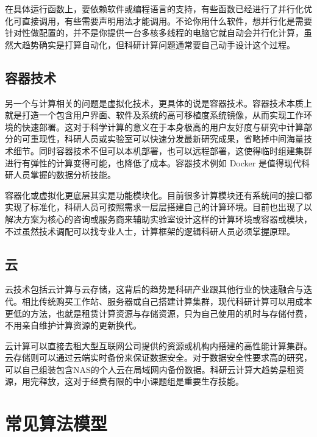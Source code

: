 \documentclass[]{tufte-book}
\begin{document}
在具体运行函数上，要依赖软件或编程语言的支持，有些函数已经进行了并行化优化可直接调用，有些需要声明用法才能调用。不论你用什么软件，想并行化是需要针对性做配置的，并不是你提供一台多核多线程的电脑它就自动会并行化计算，虽然大趋势确实是打算自动化，但科研计算问题通常要自己动手设计这个过程。

\hypertarget{ux5bb9ux5668ux6280ux672f}{%
\subsection{容器技术}\label{ux5bb9ux5668ux6280ux672f}}

另一个与计算相关的问题是虚拟化技术，更具体的说是容器技术。容器技术本质上就是打造一个包含用户界面、软件及系统的高可移植度系统镜像，从而实现工作环境的快速部署。这对于科学计算的意义在于本身极高的用户友好度与研究中计算部分的可重现性，科研人员或实验室可以快速分发最新研究成果，省略掉中间海量技术细节。同时容器技术不但可以本机部署，也可以远程部署，这使得临时组建集群进行有弹性的计算变得可能，也降低了成本。容器技术例如 Docker 是值得现代科研人员掌握的数据分析技能。

容器化或虚拟化更底层其实是功能模块化。目前很多计算模块还有系统间的接口都实现了标准化，科研人员可按照需求一层层搭建自己的计算环境。目前也出现了以解决方案为核心的咨询或服务商来辅助实验室设计这样的计算环境或容器或模块，不过虽然技术调配可以找专业人士，计算框架的逻辑科研人员必须掌握原理。

\hypertarget{ux4e91}{%
\subsection{云}\label{ux4e91}}

云技术包括云计算与云存储，这背后的趋势是科研产业跟其他行业的快速融合与迭代。相比传统购买工作站、服务器或自己搭建计算集群，现代科研计算可以用成本更低的方法，也就是租赁计算资源与存储资源，只为自己使用的机时与存储付费，不用亲自维护计算资源的更新换代。

云计算可以直接去租大型互联网公司提供的资源或机构内搭建的高性能计算集群。云存储则可以通过云端实时备份来保证数据安全。对于数据安全性要求高的研究，可以自己组装包含NAS的个人云在局域网内备份数据。科研云计算大趋势是租资源，用完释放，这对于经费有限的中小课题组是重要生存技能。

\hypertarget{ux5e38ux89c1ux7b97ux6cd5ux6a21ux578b}{%
\section{常见算法模型}\label{ux5e38ux89c1ux7b97ux6cd5ux6a21ux578b}}
\end{document}

